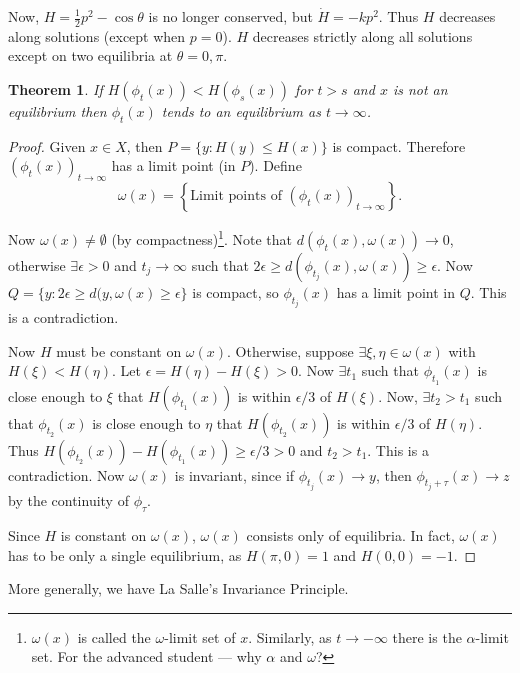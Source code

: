 \documentclass{notes}
\theoremstyle{plain}
\newtheorem*{theorem}{Theorem}
\begin{document}
Now, $H = \tfrac{1}{2} p^2 - \cos \theta$ is no longer conserved, but
$\dot{H} = - k p^2$.  Thus $H$ decreases along solutions (except when
$p=0$).  $H$ decreases strictly along all solutions except on two
equilibria at $\theta = 0, \pi$.

\begin{theorem}
  If $H\left(\phi_t(x)\right) < H\left(\phi_s(x)\right)$ for $t > s$
  and $x$ is not an equilibrium then $\phi_t(x)$ tends to an
  equilibrium as $t \rightarrow \infty$.
\end{theorem}

\begin{proof}
  Given $x \in X$, then $P = \{ y : H(y) \le H(x) \}$ is compact.
  Therefore $\left( \phi_t(x) \right)_{t \rightarrow \infty}$ has a
  limit point (in $P$).  Define
\[
\omega(x) = \left\{ \text{Limit points of } \left( \phi_t(x)
  \right)_{t \rightarrow \infty} \right\}.
\]

Now $\omega(x) \neq \emptyset$ (by compactness)\footnote{$\omega(x)$
  is called the $\omega$-limit set of $x$.  Similarly, as $t
  \rightarrow -\infty$ there is the $\alpha$-limit set.  For the
  advanced student --- why $\alpha$ and $\omega$?}.  Note that
$d(\phi_t(x),\omega(x)) \rightarrow 0$, otherwise $\exists \epsilon >
0$ and $t_j \rightarrow \infty$ such that $2 \epsilon \ge
d(\phi_{t_j}(x),\omega(x)) \ge \epsilon$.  Now $Q = \{ y : 2 \epsilon
\ge d(y,\omega(x) \ge \epsilon \}$ is compact, so $\phi_{t_j}(x)$ has
a limit point in $Q$.  This is a contradiction.

Now $H$ must be constant on $\omega(x)$.  Otherwise, suppose $\exists
\xi, \eta \in \omega(x)$ with $H(\xi) < H(\eta)$.  Let $\epsilon =
H(\eta) - H(\xi) > 0$.  Now $\exists t_1$ such that $\phi_{t_1}(x)$ is
close enough to $\xi$ that $H(\phi_{t_1}(x))$ is within $\epsilon/3$
of $H(\xi)$.  Now, $\exists t_2 > t_1$ such that $\phi_{t_2}(x)$ is
close enough to $\eta$ that $H(\phi_{t_2}(x))$ is within $\epsilon/3$
of $H(\eta)$.  Thus $H(\phi_{t_2}(x)) - H(\phi_{t_1}(x)) \ge \epsilon
/3 > 0$ and $t_2 > t_1$.  This is a contradiction.  Now $\omega(x)$ is
invariant, since if $\phi_{t_j}(x) \rightarrow y$, then
$\phi_{t_j+\tau}(x) \rightarrow z$ by the continuity of $\phi_{\tau}$.

Since $H$ is constant on $\omega(x)$, $\omega(x)$ consists only of
equilibria.  In fact, $\omega(x)$ has to be only a single equilibrium,
as $H(\pi,0) = 1$ and $H(0,0) = -1$.
\end{proof}

More generally, we have La Salle's Invariance Principle.
\end{document}
